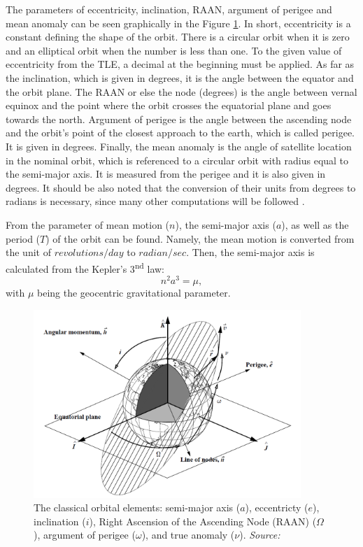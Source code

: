 The parameters of eccentricity, inclination, RAAN, argument of perigee and mean anomaly can be seen graphically in the Figure \ref{keplerian_elements}. In short, eccentricity is a constant defining the shape of the orbit. There is a circular orbit when it is zero and an elliptical orbit when the number is less than one. To the given value of eccentricity from the TLE, a decimal at the beginning must be applied. As far as the inclination, which is given in degrees, it is the angle between the equator and the orbit plane. The RAAN or else the node (degrees) is the angle between vernal equinox and the point where the orbit crosses the equatorial plane and goes towards the north. Argument of perigee is the angle between the ascending node and the orbit's point of the closest approach to the earth, which is called perigee. It is given in degrees. Finally, the mean anomaly is the angle of satellite location in the nominal orbit, which is referenced to a circular orbit with radius equal to the semi-major axis. It is measured from the perigee and it is also given in degrees. It should be also noted that the conversion of their units from degrees to radians is necessary, since many other computations will be followed \cite{Vallado}.

From the parameter of mean motion ($n$), the semi-major axis ($a$), as well as the period ($T$) of the orbit can be found. Namely, the mean motion is converted from the unit of $revolutions/day$ to $radian/sec$. Then, the semi-major axis is calculated from the Kepler's 3\textsuperscript{nd} law:
\begin{equation}
\label{3rd_keplers_law}
n^2 a^3 = \mu,
\end{equation}
with $\mu$ being the geocentric gravitational parameter.

\begin{figure}
\centering
\includegraphics[width=0.9\textwidth]{Images/keplerian_elements.png}\caption{The classical orbital elements: semi-major axis ($a$), eccentricty ($e$), inclination ($i$), Right Ascension of the Ascending Node (RAAN) ($\Omega$), argument of perigee ($\omega$), and true anomaly ($\nu$). \textit{Source: \cite{Vallado}}}
\label{keplerian_elements} 
\end{figure}

